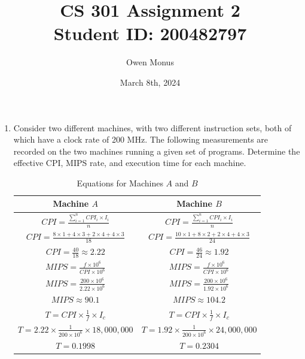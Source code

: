 \documentclass{article}
\begin{document}
\title{CS 301 Assignment 2\\[0.5cm]\large Student ID: 200482797}
\author{Owen Monus}
\date{March 8th, 2024}

\maketitle

\begin{enumerate}
    \raggedright
    \item Consider two different machines, with two different instruction sets, both of which have a
    clock rate of 200 MHz. The following measurements are recorded on the two machines running a given
    set of programs. Determine the effective CPI, MIPS rate, and execution time for each machine.
        
    \begin{table}[htbp]
        \centering
        \renewcommand{\arraystretch}{2}
        \caption{Equations for Machines \(A\) and \(B\)}
        \label{tab:equations}
        \begin{tabular}{c|c}
            Machine \(A\) & Machine \(B\) \\
            \hline
            \( CPI = \frac{\sum_{i=1}^{n}{CPI_i \times I_i}}{{n}} \) & 
            \( CPI = \frac{\sum_{i=1}^{n}{CPI_i \times I_i}}{{n}} \) \\
            \( CPI = \frac{8 \times 1 + 4 \times 3 + 2 \times 4 + 4 \times 3}{18} \) & 
            \( CPI = \frac{10 \times 1 + 8 \times 2 + 2 \times 4 + 4 \times 3}{24} \) \\
            \( CPI = \frac{40}{18} \approx 2.22 \) & \( CPI = \frac{46}{24} \approx 1.92\) \\
            \hline
            \( MIPS = \frac{f \times 10^6}{CPI \times 10^6} \) & 
            \( MIPS = \frac{f \times 10^6}{CPI \times 10^6} \) \\
            \( MIPS = \frac{200 \times 10^6}{2.22 \times 10^6} \) & 
            \( MIPS = \frac{200 \times 10^6}{1.92 \times 10^6} \) \\
            
            \( MIPS \approx 90.1 \) & 
            \( MIPS \approx 104.2 \) \\
            \hline
            \( T = CPI \times \frac{1}{f} \times I_c \) & 
            \( T = CPI \times \frac{1}{f} \times I_c \) \\
            \( T = 2.22 \times \frac{1}{200 \times 10^6} \times 18,000,000 \) & 
            \( T = 1.92 \times \frac{1}{200 \times 10^6} \times 24,000,000 \) \\
            \( T = 0.1998 \) & 
            \( T = 0.2304\) \\
        \end{tabular}
    \end{table}


\end{enumerate}
\end{document}
